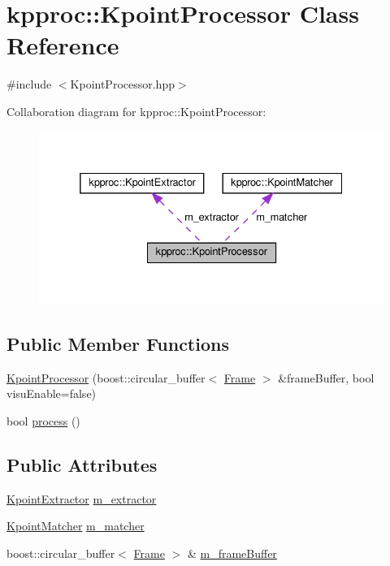 \hypertarget{classkpproc_1_1KpointProcessor}{}\section{kpproc\+:\+:Kpoint\+Processor Class Reference}
\label{classkpproc_1_1KpointProcessor}


{\ttfamily \#include $<$Kpoint\+Processor.\+hpp$>$}



Collaboration diagram for kpproc\+:\+:Kpoint\+Processor\+:\nopagebreak
\begin{figure}[H]
\begin{center}
\leavevmode
\includegraphics[width=332pt]{classkpproc_1_1KpointProcessor__coll__graph}
\end{center}
\end{figure}
\subsection*{Public Member Functions}
\begin{DoxyCompactItemize}
\item 
\hyperlink{classkpproc_1_1KpointProcessor_a7a10f7352ccb9ab714052144bde69228}{Kpoint\+Processor} (boost\+::circular\+\_\+buffer$<$ \hyperlink{classFrame}{Frame} $>$ \&frame\+Buffer, bool visu\+Enable=false)
\item 
bool \hyperlink{classkpproc_1_1KpointProcessor_a35bdf2239f6742875bbc64338488075a}{process} ()
\end{DoxyCompactItemize}
\subsection*{Public Attributes}
\begin{DoxyCompactItemize}
\item 
\hyperlink{classkpproc_1_1KpointExtractor}{Kpoint\+Extractor} \hyperlink{classkpproc_1_1KpointProcessor_a5ae3277154dd03cddf303d3be6bb37f7}{m\+\_\+extractor}
\item 
\hyperlink{classkpproc_1_1KpointMatcher}{Kpoint\+Matcher} \hyperlink{classkpproc_1_1KpointProcessor_a188352f2093e636cbb06114b4ac7288a}{m\+\_\+matcher}
\item 
boost\+::circular\+\_\+buffer$<$ \hyperlink{classFrame}{Frame} $>$ \& \hyperlink{classkpproc_1_1KpointProcessor_a7faab52da545a233fab6ec061338393e}{m\+\_\+frame\+Buffer}
\end{DoxyCompactItemize}
